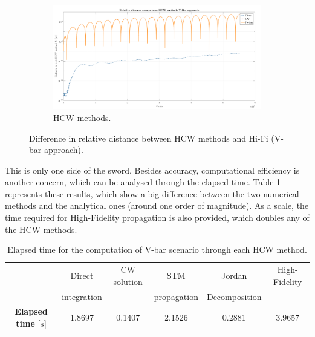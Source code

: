 		\begin{figure}[!htb]
		\centering
		\ContinuedFloat
		\begin{subfigure}[t]{\linewidth}
		\begin{changemargin}{-1.3cm}{-1cm}
		\begin{adjustbox}{width=1.1\textwidth}
		\centering\includegraphics[width = \linewidth]{Chapters/Chapter_02/High_quality/dr_comp_HCW_V_bar_approach}
		\end{adjustbox}
		\end{changemargin}
		\caption{HCW methods.}
		\label{figCh2:dr_comp_HCW_V_bar_approach}
		\end{subfigure}
		\caption{Difference in relative distance between HCW methods and Hi-Fi (V-bar approach).}
		\end{figure}
		\FloatBarrier
		\indent This is only one side of the sword. Besides accuracy, computational efficiency is another concern, which can be analysed through the elapsed time. Table \ref{tabCh2:HCW_Vbar} represents these results, which show a big difference between the two numerical methods and the analytical ones (around one order of magnitude). As a scale, the time required for High-Fidelity propagation is also provided, which doubles any of the HCW methods.
		\begin{table}[!htb]
		\centering
		\begin{tabular}{|c|c|c|c|c|c|}
		\hline 
		\rowcolor{Gray!10}
		 													& Direct 		& CW solution 		& STM 			& Jordan  			& High-Fidelity \\ 
		\rowcolor{Gray!10} 
		\multirow{-2}{*}{\textbf{Method}}					& integration 	&   				& propagation 	&  Decomposition 	&  \\ 
		\hline 
		\cellcolor{Gray!10} {\textbf{Elapsed time} [$s$]} 	& 1.8697 & 0.1407 & 2.1526 & 0.2881 & 3.9657 \\ 
		\hline 
		\end{tabular} 
		\caption{Elapsed time for the computation of V-bar scenario through each HCW method.}
		\label{tabCh2:HCW_Vbar}
		\end{table}
